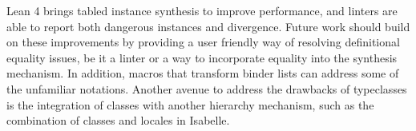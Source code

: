 \documentclass[a4paper,UKenglish,cleveref, autoref, thm-restate]{lipics-v2021}
\begin{document}
Lean 4 brings tabled instance synthesis to improve performance,
and linters are able to report both dangerous instances and divergence.
Future work should build on these improvements by providing a user friendly way of resolving definitional equality issues,
be it a linter or a way to incorporate equality into the synthesis mechanism.
In addition, macros that transform binder lists can address some of the unfamiliar notations.
Another avenue to address the drawbacks of typeclasses is the integration of classes with another hierarchy mechanism, such as the combination of classes and locales in Isabelle.


\end{document}
